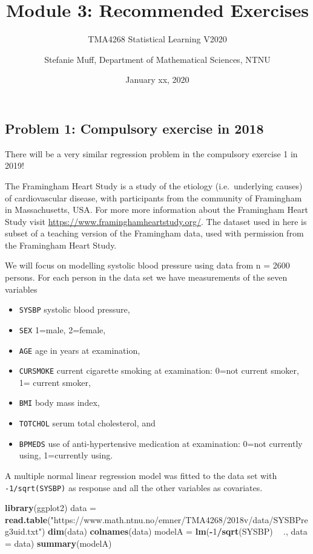 \documentclass[]{article}
\title{Module 3: Recommended Exercises}
\subtitle{TMA4268 Statistical Learning V2020}
\author{Stefanie Muff, Department of Mathematical Sciences, NTNU}
\date{January xx, 2020}
\newenvironment{Shaded}{\begin{snugshade}}{\end{snugshade}}
\newcommand{\KeywordTok}[1]{\textcolor[rgb]{0.13,0.29,0.53}{\textbf{#1}}}
\newcommand{\DataTypeTok}[1]{\textcolor[rgb]{0.13,0.29,0.53}{#1}}
\newcommand{\DecValTok}[1]{\textcolor[rgb]{0.00,0.00,0.81}{#1}}
\newcommand{\StringTok}[1]{\textcolor[rgb]{0.31,0.60,0.02}{#1}}
\newcommand{\OperatorTok}[1]{\textcolor[rgb]{0.81,0.36,0.00}{\textbf{#1}}}
\newcommand{\NormalTok}[1]{#1}
\providecommand{\tightlist}{%
  \setlength{\itemsep}{0pt}\setlength{\parskip}{0pt}}
\begin{document}
\maketitle

{
\setcounter{tocdepth}{2}
\tableofcontents
}
\subsection{Problem 1: Compulsory exercise in
2018}\label{problem-1-compulsory-exercise-in-2018}

There will be a very similar regression problem in the compulsory
exercise 1 in 2019!

The Framingham Heart Study is a study of the etiology (i.e.~underlying
causes) of cardiovascular disease, with participants from the community
of Framingham in Massachusetts, USA. For more more information about the
Framingham Heart Study visit
\url{https://www.framinghamheartstudy.org/}. The dataset used in here is
subset of a teaching version of the Framingham data, used with
permission from the Framingham Heart Study.

We will focus on modelling systolic blood pressure using data from n =
2600 persons. For each person in the data set we have measurements of
the seven variables

\begin{itemize}
\tightlist
\item
  \texttt{SYSBP} systolic blood pressure,
\item
  \texttt{SEX} 1=male, 2=female,
\item
  \texttt{AGE} age in years at examination,
\item
  \texttt{CURSMOKE} current cigarette smoking at examination: 0=not
  current smoker, 1= current smoker,
\item
  \texttt{BMI} body mass index,
\item
  \texttt{TOTCHOL} serum total cholesterol, and
\item
  \texttt{BPMEDS} use of anti-hypertensive medication at examination:
  0=not currently using, 1=currently using.
\end{itemize}

A multiple normal linear regression model was fitted to the data set
with \texttt{-1/sqrt(SYSBP)} as response and all the other variables as
covariates.

\begin{Shaded}
\begin{Highlighting}[]
\KeywordTok{library}\NormalTok{(ggplot2)}
\NormalTok{data =}\StringTok{ }\KeywordTok{read.table}\NormalTok{(}\StringTok{"https://www.math.ntnu.no/emner/TMA4268/2018v/data/SYSBPreg3uid.txt"}\NormalTok{)}
\KeywordTok{dim}\NormalTok{(data)}
\KeywordTok{colnames}\NormalTok{(data)}
\NormalTok{modelA =}\StringTok{ }\KeywordTok{lm}\NormalTok{(}\OperatorTok{-}\DecValTok{1}\OperatorTok{/}\KeywordTok{sqrt}\NormalTok{(SYSBP) }\OperatorTok{~}\StringTok{ }\NormalTok{., }\DataTypeTok{data =}\NormalTok{ data)}
\KeywordTok{summary}\NormalTok{(modelA)}
\end{Highlighting}
\end{Shaded}
\end{document}
